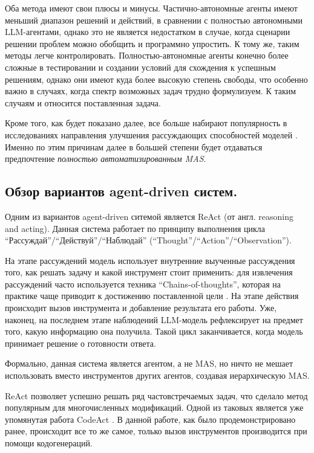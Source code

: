 Оба метода имеют свои плюсы и минусы. Частично-автономные агенты имеют меньший диапазон
решений и действий, в сравнении с полностью автономными LLM-агентами, однако это не 
является недостатком в случае, когда сценарии решении проблем можно обобщить и программно
упростить. К тому же, таким методы легче контролировать. Полностью-автономные агенты 
конечно более сложные в тестировании и создании условий для схождения к успешным решениям,
однако они имеют куда более высокую степень свободы, что особенно важно в случаях,
когда спектр возможных задач трудно формулизуем. К таким случаям и относится поставленная
задача. 

Кроме того, как будет показано далее, все больше набирают популярность в исследованиях
направления улучшения рассуждающих способностей моделей \cite{deepseekr1, rl-star}.
Именно по этим причинам далее в большей степени будет отдаваться предпочтение
 \textit{полностью автоматизированным MAS}.

\subsection{Обзор вариантов agent-driven систем.} \label{ch2:sec2:subsec1}

Одним из вариантов agent-driven ситемой является ReAct \cite{react} (от англ. reasoning
and acting). 
Данная система работает по принципу выполнения цикла ``Рассуждай''/``Действуй''/``Наблюдай'' 
(``Thought''/``Action''/``Observation''). 

На этапе рассуждений модель использует внутренние выученные рассуждения того, 
как решать задачу и какой инструмент стоит применить: 
для извлечения рассуждений часто используется техника ``Chains-of-thoughts'', 
которая на практике чаще приводит к достижению поставленной цели \cite{zeroshot-cot}. 
На этапе действия происходит вызов инструмента и добавление результата его работы.
Уже, наконец, на последнем этапе наблюдений LLM-модель рефлексирует на предмет того,
какую информацию она получила. Такой цикл заканчивается, когда модель принимает решение
о готовности ответа.

Формально, данная система является агентом, а не MAS, но ничто не мешает использовать
вместо инструментов других агентов, создавая иерархическую MAS.

ReAct позволяет успешно решать ряд частовстречаемых задач, 
что сделало метод популярным для многочисленных модификаций. 
Одной из таковых является уже упомянутая работа CodeAct \cite{codeact}. 
В данной работе, как было продемонстрировано ранее, происходит все
то же самое, только вызов инструментов производится при помощи кодогенераций.

